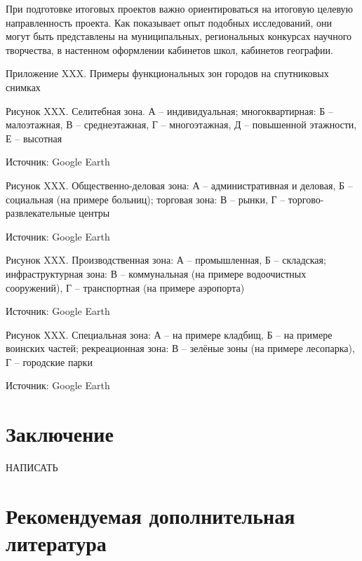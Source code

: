 \documentclass[
  11pt,
  russian,
]{book}
\begin{document}
При подготовке итоговых проектов важно ориентироваться на итоговую целевую направленность проекта. Как показывает опыт подобных исследований, они могут быть представлены на муниципальных, региональных конкурсах научного творчества,
в настенном оформлении кабинетов школ, кабинетов географии.

Приложение XXX.
Примеры функциональных зон городов на спутниковых снимках

Рисунок XXX. Селитебная зона. А --
индивидуальная; многоквартирная: Б -- малоэтажная, В -- среднеэтажная, Г --
многоэтажная, Д -- повышенной этажности, Е -- высотная

Источник: Google
Earth

Рисунок XXX.
Общественно-деловая зона: А -- административная и деловая, Б -- социальная (на
примере больниц); торговая зона: В -- рынки, Г -- торгово-развлекательные центры

Источник: Google
Earth

Рисунок XXX.
Производственная зона: А -- промышленная, Б -- складская; инфраструктурная зона:
В -- коммунальная (на примере водоочистных сооружений), Г -- транспортная (на
примере аэропорта)

Источник: Google Earth

Рисунок XXX.
Специальная зона: А -- на примере кладбищ, Б -- на примере воинских частей; рекреационная
зона: В -- зелёные зоны (на примере лесопарка), Г -- городские парки

Источник: Google Earth

\hypertarget{conclusion}{%
\chapter{Заключение}\label{conclusion}}

НАПИСАТЬ

\hypertarget{biblio}{%
\chapter{\texorpdfstring{\textbf{Рекомендуемая дополнительная литература}}{Рекомендуемая дополнительная литература}}\label{biblio}}
\end{document}
